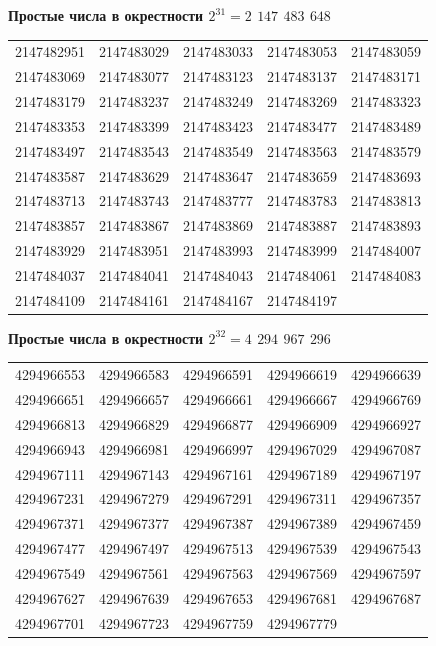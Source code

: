 \documentclass{mai_book}
\begin{document}
{\newpage
\thispagestyle{empty}
\begin{center}
	{\large\textbf{Простые числа в окрестности $2^{31} = 2$ $147$ $483$ $648$}}
\end{center}
\hspace{0.625cm}\begin{tabular}{rrrrr}
	2147482951 & 2147483029 & 2147483033 & 2147483053 & 2147483059 \\
	2147483069 & 2147483077 & 2147483123 & 2147483137 & 2147483171 \\
	2147483179 & 2147483237 & 2147483249 & 2147483269 & 2147483323 \\
	2147483353 & 2147483399 & 2147483423 & 2147483477 & 2147483489 \\
	2147483497 & 2147483543 & 2147483549 & 2147483563 & 2147483579 \\
	2147483587 & 2147483629 & 2147483647 & 2147483659 & 2147483693 \\
	2147483713 & 2147483743 & 2147483777 & 2147483783 & 2147483813 \\
	2147483857 & 2147483867 & 2147483869 & 2147483887 & 2147483893 \\
	2147483929 & 2147483951 & 2147483993 & 2147483999 & 2147484007 \\
	2147484037 & 2147484041 & 2147484043 & 2147484061 & 2147484083 \\
	2147484109 & 2147484161 & 2147484167 & 2147484197
\end{tabular}

\begin{center}
	{\large\textbf{Простые числа в окрестности $2^{32} = 4$ $294$ $967$ $296$}}
\end{center}
\hspace{0.625cm}\begin{tabular}{rrrrr}
	4294966553 & 4294966583 & 4294966591 & 4294966619 & 4294966639 \\
	4294966651 & 4294966657 & 4294966661 & 4294966667 & 4294966769 \\
	4294966813 & 4294966829 & 4294966877 & 4294966909 & 4294966927 \\
	4294966943 & 4294966981 & 4294966997 & 4294967029 & 4294967087 \\
	4294967111 & 4294967143 & 4294967161 & 4294967189 & 4294967197 \\
	4294967231 & 4294967279 & 4294967291 & 4294967311 & 4294967357 \\
	4294967371 & 4294967377 & 4294967387 & 4294967389 & 4294967459 \\
	4294967477 & 4294967497 & 4294967513 & 4294967539 & 4294967543 \\
	4294967549 & 4294967561 & 4294967563 & 4294967569 & 4294967597 \\
	4294967627 & 4294967639 & 4294967653 & 4294967681 & 4294967687 \\
	4294967701 & 4294967723 & 4294967759 & 4294967779
\end{tabular}

}
\end{document}
